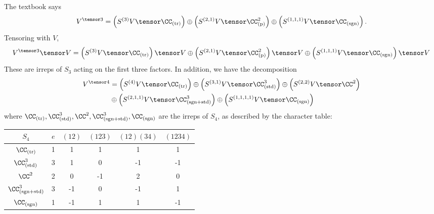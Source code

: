 \documentclass[11pt, headheight=30pt]{scrartcl}
\begin{document}
The textbook says
\[
    V^{\tensor 3} = \left(S^{(3)}V \tensor \CC_{\text{(tr)}}\right) \oplus \left(S^{(2,1)}V \tensor \CC^2_{\text{(p)}}\right) \oplus \left(S^{(1,1,1)}V \tensor \CC_{\text{(sgn)}}\right).
\]
Tensoring with $V$,
\[
    V^{\tensor 3} \tensor V =  \left(
        S^{(3)}V \tensor \CC_{\text{(tr)}}\right)\tensor V  \oplus \left(S^{(2,1)}V\tensor \CC^2_{\text{(p)}}\right) \tensor V  \oplus \left(S^{(1,1,1)}V \tensor \CC_{\text{(sgn)}}\right)\tensor V 
\]
These are irreps of $S_3$ acting on the first three factors. In addition, we have the decomposition
\begin{align*}
    V^{\tensor 4} &= \left(S^{(4)}V \tensor \CC_{\text{(tr)}}\right) \oplus \left(S^{(3,1)}V \tensor \CC^3_{\text{(std)}}\right) \oplus \left(S^{(2,2)}V \tensor \CC^2_{}\right)\\
    &\oplus \left(S^{(2,1,1)}V \tensor \CC^3_{\text{(sgn+std)}}\right) \oplus \left(S^{(1,1,1,1)}V \tensor \CC_{\text{(sgn)}}\right)
\end{align*}
where $\CC_{\text{(tr)}}, \CC^3_{\text{(std)}}, \CC^2_{}, \CC^3_{\text{(sgn+std)}}, \CC_{\text{(sgn)}}$ are the irreps of $S_4$, as described by the character table:
\begin{center}
\begin{tabular}{c|ccccc}
    $S_4$ & $e$ & $(12)$ & $(123)$ & $(12)(34)$ & $(1234)$ \\
    \hline
    $\CC_{\text{(tr)}}$ & 1 & 1 & 1 & 1 & 1 \\
    $\CC^3_{\text{(std)}}$ & 3 & 1 & 0 & -1 & -1 \\
    $\CC^2_{}$ & 2 & 0 & -1 & 2 & 0 \\
    $\CC^3_{\text{(sgn+std)}}$ & 3 & -1 & 0 & -1 & 1 \\
    $\CC_{\text{(sgn)}}$ & 1 & -1 & 1 & 1 & -1 
\end{tabular}
\end{center}
\end{document}
